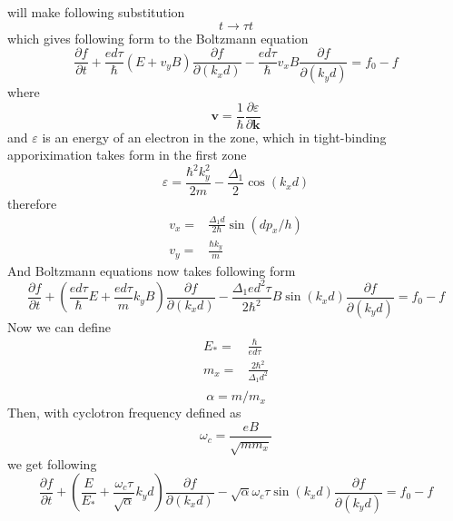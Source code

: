 \documentclass[40pt,letterpaper,physrev]{article}
\begin{document}
    will make following substitution
    \begin{equation}
     t \to \tau t
    \end{equation}
    which gives following form to the Boltzmann equation
    \begin{equation}
     \frac{\partial f}{\partial t}+
     \frac{ed\tau}{\hbar}(E+v_{y}B)\frac{\partial f}{\partial(k_x d)}-
     \frac{ed\tau}{\hbar}v_{x}B\frac{\partial f}{\partial(k_y d)}
     = f_0 - f
    \end{equation}
    where 
    \begin{equation}
     \mathbf{v}=\frac{1}{\hbar}\frac{\partial\varepsilon}{\partial\mathbf{k}}
    \end{equation}
    and $\varepsilon$ is an energy of an electron in the zone, which in tight-binding apporiximation takes form in the first zone
    \begin{equation}
     \varepsilon=\frac{\hbar^2k^2_y}{2m}-\frac{\Delta_{1}}{2}\cos(k_{x}d)\label{eq:energy_unscaled}
    \end{equation}
    therefore
    \begin{align}
     v_x=&\frac{\Delta_{1}d}{2\hbar}\sin(dp_x/h) \\
     v_y=&\frac{\hbar k_y}{m}
    \end{align}
    And Boltzmann equations now takes following form
   \begin{equation}
     \frac{\partial f}{\partial t}+
     \left ( \frac{ed\tau}{\hbar}E+\frac{ed\tau}{m}k_yB \right ) \frac{\partial f}{\partial(k_x d)}-
     \frac{\Delta_{1}ed^2\tau}{2\hbar^2}B\sin(k_{x}d)\frac{\partial f}{\partial(k_y d)}
     = f_0 - f
   \end{equation}
   Now we can define
   \begin{align}
	E_*=&\frac{\hbar}{ed\tau} \\	
	m_x=&\frac{2\hbar^2}{\Delta_1 d^2} \\
   \end{align}
   \begin{equation}
	\boxed{\alpha=m/m_x}\label{eq:alpha_def}
   \end{equation}
   Then, with cyclotron frequency defined as 
   \begin{equation}
	\omega_c=\frac{eB}{\sqrt{mm_x}}
   \end{equation}
   we get following
   \begin{equation}
     \frac{\partial f}{\partial t}+
     \left ( \frac{E}{E_*}+\frac{\omega_{c}\tau}{\sqrt{\alpha}}k_yd \right ) \frac{\partial f}{\partial(k_x d)}-
     \sqrt{\alpha}\omega_c\tau\sin(k_x d)\frac{\partial f}{\partial(k_y d)}
     = f_0 - f
   \end{equation}
\end{document}
